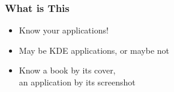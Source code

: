 \begin{frame}
 \frametitle{What is This}

	\begin{itemize}
		\item Know your applications!
		\item May be KDE applications, or maybe not
        \item Know a book by its cover,\\\quad an application by its screenshot
	\end{itemize}
\end{frame}

\newcommand*\answers{}
\newcommand*\answerimages{}
\makeatletter
{}
\def\witq#1#2#3#4#5#6{
    \begin{frame}
    \frametitle{What is This}
    \begin{columns}
    \begin{column}{0.7\textwidth}
        \vspace{-1cm}
        \begin{center}
        \noindent\texttt{[image: img/wit-\#1-q.png]}
        \end{center}
    \end{column}
    \begin{column}{0.3\textwidth}
        \bigskip
        \begin{enumerate}
            \item[A] #2
            \item[B] #3
            \item[C] #4
            \item[D] #5
            \item[E] #6
        \end{enumerate}
    \end{column}
    \end{columns}
    \end{frame}
    \def\@ansX{#1}%
    \def\@ansA{#2}%
    \def\@ansB{#3}%
    \def\@ansC{#4}%
    \def\@ansD{#5}%
    \def\@ansE{#6}%
    \stepcounter{@qnum}
    \edef\@n{\arabic{@qnum}}%
    \ifx\@ansX\@ansA\def\@a{A}%
    \else%
    \ifx\@ansX\@ansB\def\@a{B}%
    \else%
    \ifx\@ansX\@ansC\def\@a{C}%
    \else%
    \ifx\@ansX\@ansD\def\@a{D}%
    \else%
    \ifx\@ansX\@ansE\def\@a{E}%
    \else%
    \def\@a{?}%
    \fi\fi\fi\fi\fi
    \edef\@arg{{#1}{\@a}{\@n}}
    \expandafter\@witq\@arg
}
\def\@witq#1#2#3{
    \g@addto@macro\answers{\item<#3,\arabic{@qnum}> #2 #1\pause}%
    \g@addto@macro\answerimages{\only<#3>{\noindent\texttt{[image: img/wit-\#1.png]}}}
}
\makeatother

